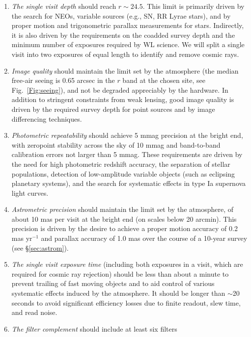 \documentclass{emulateapj}
\begin{document}
\begin{enumerate}
\item  {\it The single visit depth} should reach $r\sim24.5$. This limit is
   primarily driven by the search for NEOs, variable sources (e.g., SN,
   RR Lyrae stars), and by proper motion and trigonometric parallax 
   measurements for stars. Indirectly, it is also driven by the
   requirements on the coadded survey depth and the minimum number of 
   exposures required by WL science.  We will split a single visit
   into two exposures of equal length to identify and remove cosmic
   rays.  
\item  {\it Image quality} should maintain the limit set by the 
     atmosphere (the median free-air seeing is 0.65 arcsec in the $r$ band 
     at the chosen site, see Fig.~\ref{Fig:seeing}),
     and not be degraded appreciably by the hardware. In addition to stringent 
     constraints from weak lensing, good image quality is driven by the 
     required survey depth for point sources and by image differencing
     techniques. 
\item  {\it Photometric repeatability} should achieve 5 mmag precision
     at the bright end, with zeropoint stability across the sky of 10 mmag
     and band-to-band calibration errors not larger than 5 mmag.
     These requirements are driven by the need for high photometric redshift accuracy,
     the separation of stellar populations, detection of low-amplitude variable
     objects (such as eclipsing planetary systems), and the search for
     systematic effects in type Ia supernova light curves.
\item  {\it Astrometric precision} should maintain the limit set by 
     the atmosphere, of about 10 mas per visit at the bright end
     (on scales below 20 arcmin). This precision is driven by the desire to 
     achieve a proper motion accuracy of 0.2 mas yr$^{-1}$ and parallax accuracy of 
     1.0 mas over the course of a 10-year survey (see \S \ref{sec:astrom}).
\item  {\it The single visit exposure time} (including both exposures in a 
    visit, which are required for cosmic ray rejection) should be less than about a minute 
    to prevent trailing of fast moving objects and to aid control 
    of various systematic effects induced by the atmosphere. It should
    be longer than $\sim$20 seconds to avoid significant efficiency losses due to
    finite readout, slew time, and read noise.
\item  {\it The filter complement} should include at least six filters

\end{enumerate}
\end{document}

